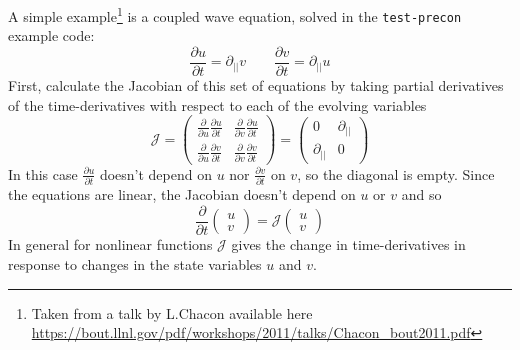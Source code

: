 \documentclass[12pt]{article}
\begin{document}
A simple example\footnote{Taken from a talk by L.Chacon available here \url{https://bout.llnl.gov/pdf/workshops/2011/talks/Chacon_bout2011.pdf}} is a coupled wave equation, solved in the \texttt{test-precon} example code:
\[
\frac{\partial u}{\partial t} = \partial_{||}v \qquad \frac{\partial v}{\partial t} = \partial_{||} u
\]
First, calculate the Jacobian of this set of equations by taking partial derivatives of the time-derivatives with respect to each of the evolving variables
\[
\mathcal{J} = \left(\begin{array}{cc}
\frac{\partial}{\partial u}\frac{\partial u}{\partial t} & \frac{\partial}{\partial v}\frac{\partial u}{\partial t}\\
\frac{\partial}{\partial u}\frac{\partial v}{\partial t} & \frac{\partial}{\partial v}\frac{\partial v}{\partial t}
\end{array}\right) = \left(\begin{array}{cc}
0 & \partial_{||} \\
\partial_{||} & 0
\end{array}\right)
\]
In this case $\frac{\partial u}{\partial t}$ doesn't depend on $u$ nor $\frac{\partial v}{\partial t}$ on $v$,
so the diagonal is empty. Since the equations are linear, the Jacobian doesn't depend on $u$ or $v$ and so
\[
\frac{\partial}{\partial t}\left(\begin{array}{c}
u \\
v
\end{array}\right) = \mathcal{J} \left(\begin{array}{c}
u \\
v
\end{array}\right)
\]
In general for nonlinear functions $\mathcal{J}$ gives the change in time-derivatives in response to changes
in the state variables $u$ and $v$. 
\end{document}
